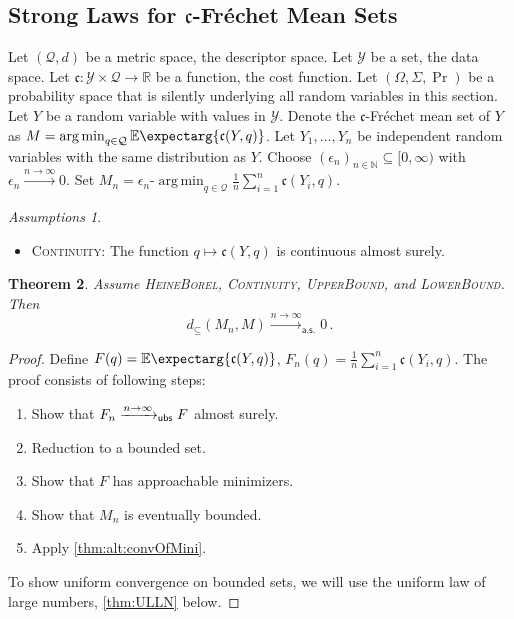 \documentclass{scrartcl}
\renewcommand{\subset}{\subseteq}
\newcommand{\Ex}{\E\expectarg}
\newcommand*{\mc}[1]{\mathcal{#1}}
\newcommand*{\ms}[1]{\mathsf{#1}}
\newcommand*{\mf}[1]{\mathfrak{#1}}
\newcommand{\N}{\mathbb{N}}
\newcommand{\R}{\mathbb{R}}
\newcommand{\equationFullstop}{\, .}
\newcommand{\eqfs}{\equationFullstop}
\DeclareMathOperator*{\argmin}{arg\,min}
\theoremstyle{plain}\newtheorem{theorem}{Theorem}[section]
\theoremstyle{definition}
\theoremstyle{remark}
\newtheorem{assumptions}[theorem]{Assumptions}
\begin{document}
\begin{appendix}
\subsection{Strong Laws for $\mf c$-Fréchet Mean Sets}\label{ssec:alt:gen}
Let $(\mc Q, d)$ be a metric space, the descriptor space. Let $\mc Y$ be a set, the data space. Let $\mf c\colon \mc Y \times\mc Q \to \R$ be a function, the cost function. Let $(\Omega, \Sigma, \Pr)$ be a probability space that is silently underlying all random variables in this section. Let $Y$ be a random variable with values in $\mc Y$. Denote the $\mf c$-Fréchet mean set of $Y$ as $M = \argmin_{q\in\mc Q} \Ex{\mf c(Y, q)}$.
Let $Y_1, \dots, Y_n$ be independent random variables with the same distribution as $Y$.
Choose $(\epsilon_n)_{n\in\N}\subset [0,\infty)$ with $\epsilon_n \xrightarrow{n\to\infty}0$. Set $M_n = \epsilon_n\text{-}\argmin_{q\in\mc Q} \frac1n \sum_{i=1}^n \mf c(Y_i, q)$.
\begin{assumptions}\mbox{ }
\begin{itemize}
	\item \textsc{Continuity}:  The function $q \mapsto \mf c(Y, q)$ is continuous almost surely.
	\end{itemize}
\end{assumptions}
\begin{theorem}\label{thm:alt:consistency}
	Assume \textsc{HeineBorel}, \textsc{Continuity}, \textsc{UpperBound}, and \textsc{LowerBound}. Then
	\begin{equation*}
		d_\subset(M_n, M) \xrightarrow{n\to\infty}_{\ms{a.s.}} 0
		\eqfs
	\end{equation*}
\end{theorem}
\begin{proof}
Define $F(q) = \Ex{\mf c(Y, q)}$, $F_n(q) = \frac1n\sum_{i=1}^n \mf c(Y_i, q)$.  The proof consists of following steps:
\begin{enumerate}
\item Show that $F_n \xrightarrow{n\to\infty}_{\mathsf{ubs}} F$ almost surely.
\item Reduction to a bounded set.
\item Show that $F$ has approachable minimizers.
\item Show that $M_n$ is eventually bounded.
\item Apply \autoref{thm:alt:convOfMini}.
\end{enumerate}
\underline{}
To show uniform convergence on bounded sets, we will use the uniform law of large numbers, \autoref{thm:ULLN} below.

\end{proof}
\end{appendix}
\end{document}
